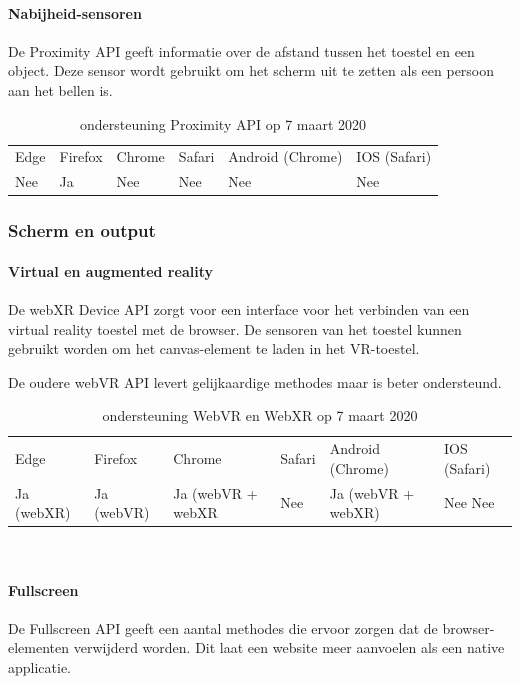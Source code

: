 			
\paragraph{Nabijheid-sensoren }
De Proximity API \autocite{Kostiainen2019} geeft informatie over de afstand tussen het toestel en een object. Deze sensor wordt gebruikt om het scherm uit te zetten als een persoon aan het bellen is.

\begin{table}[H]
	\centering
	\begin{tabular}{llllll}
		Edge & Firefox & Chrome & Safari & Android (Chrome) & IOS (Safari) \\
		Nee   & Ja      &  Nee   & Nee     & Nee               & Nee          
	\end{tabular}	
	\caption{ondersteuning  Proximity API op 7 maart 2020 }
\end{table}



\subsubsection{Scherm en output}
\paragraph{Virtual en augmented reality }
De webXR Device API \autocite{Jones2019} zorgt voor een interface voor het verbinden van een virtual reality toestel met de browser. De sensoren van het toestel kunnen gebruikt worden om het canvas-element te laden in het VR-toestel.

De oudere webVR API levert gelijkaardige methodes maar is beter ondersteund.

\begin{table}[H]
	\centering
	\begin{tabular}{llllll}
		Edge & Firefox & Chrome & Safari & Android (Chrome) & IOS (Safari) \\
		Ja (webXR)  & 	Ja (webVR)  &  	Ja (webVR + webXR  & Nee  & Ja (webVR + webXR) & Nee Nee          
	\end{tabular}	
	\caption{ondersteuning  WebVR en WebXR op 7 maart 2020 }
\end{table}\

\paragraph{Fullscreen }
De Fullscreen API \autocite{Kesteren2014} geeft een aantal methodes die ervoor zorgen dat de browser-elementen verwijderd worden. Dit laat een website meer aanvoelen als een native applicatie.


